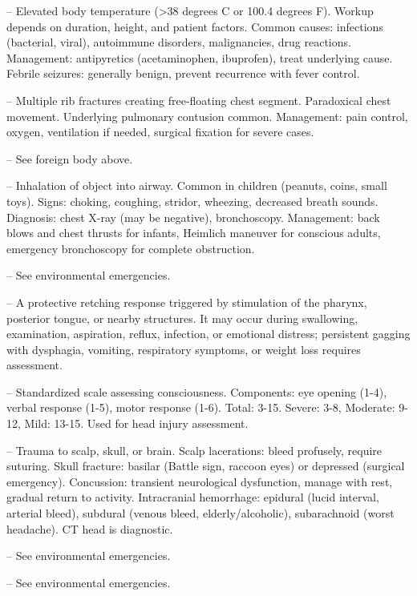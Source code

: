 -- Elevated body temperature (>38 degrees C or 100.4 degrees F). Workup depends on duration, height, and patient factors. Common causes: infections (bacterial, viral), autoimmune disorders, malignancies, drug reactions. Management: antipyretics (acetaminophen, ibuprofen), treat underlying cause. Febrile seizures: generally benign, prevent recurrence with fever control.

-- Multiple rib fractures creating free-floating chest segment. Paradoxical chest movement. Underlying pulmonary contusion common. Management: pain control, oxygen, ventilation if needed, surgical fixation for severe cases.

-- See foreign body above.

-- Inhalation of object into airway. Common in children (peanuts, coins, small toys). Signs: choking, coughing, stridor, wheezing, decreased breath sounds. Diagnosis: chest X-ray (may be negative), bronchoscopy. Management: back blows and chest thrusts for infants, Heimlich maneuver for conscious adults, emergency bronchoscopy for complete obstruction.

-- See environmental emergencies.

-- A protective retching response triggered by stimulation of the pharynx, posterior tongue, or nearby structures. It may occur during swallowing, examination, aspiration, reflux, infection, or emotional distress; persistent gagging with dysphagia, vomiting, respiratory symptoms, or weight loss requires assessment.

-- Standardized scale assessing consciousness. Components: eye opening (1-4), verbal response (1-5), motor response (1-6). Total: 3-15. Severe: 3-8, Moderate: 9-12, Mild: 13-15. Used for head injury assessment.

-- Trauma to scalp, skull, or brain. Scalp lacerations: bleed profusely, require suturing. Skull fracture: basilar (Battle sign, raccoon eyes) or depressed (surgical emergency). Concussion: transient neurological dysfunction, manage with rest, gradual return to activity. Intracranial hemorrhage: epidural (lucid interval, arterial bleed), subdural (venous bleed, elderly/alcoholic), subarachnoid (worst headache). CT head is diagnostic.

-- See environmental emergencies.

-- See environmental emergencies.

